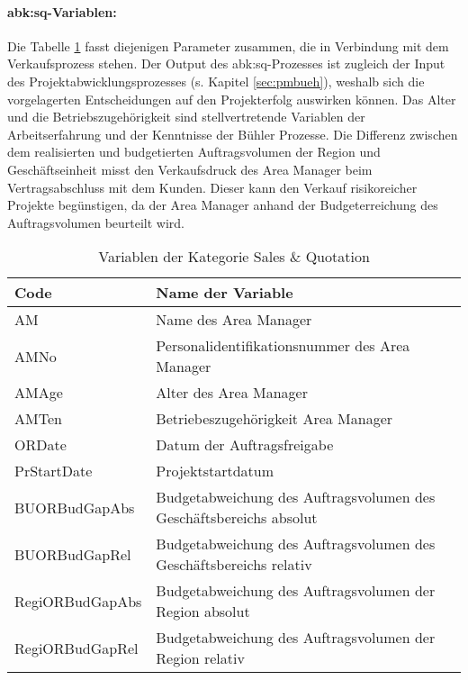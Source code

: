 \paragraph{\gls{abk:sq}-Variablen:} Die Tabelle \ref{tab:sqvar} fasst diejenigen Parameter zusammen, die in Verbindung mit dem Verkaufsprozess stehen. Der Output des \gls{abk:sq}-Prozesses ist zugleich der Input des Projektabwicklungsprozesses (s. Kapitel \ref{sec:pmbueh}), weshalb sich die vorgelagerten Entscheidungen auf den Projekterfolg auswirken können. Das Alter und die Betriebszugehörigkeit sind stellvertretende Variablen der Arbeitserfahrung und der Kenntnisse der Bühler Prozesse. Die Differenz zwischen dem realisierten und budgetierten Auftragsvolumen der Region und Geschäftseinheit misst den Verkaufsdruck des Area Manager beim Vertragsabschluss mit dem Kunden. Dieser kann den Verkauf risikoreicher Projekte begünstigen, da der Area Manager anhand der Budgeterreichung des Auftragsvolumen beurteilt wird.
\begin{table}[H]
	\centering
	\caption{Variablen der Kategorie Sales \& Quotation}
	\begin{tabular}{ll}
		\toprule
		\textbf{Code} & \textbf{Name der Variable} \\
		\midrule
		AM    & Name des Area Manager \\
		AMNo  & Personalidentifikationsnummer des Area Manager  \\
		AMAge & Alter des Area Manager  \\
		AMTen & Betriebeszugehörigkeit Area Manager  \\
		ORDate & Datum der Auftragsfreigabe \\
		PrStartDate & Projektstartdatum \\
		BUORBudGapAbs & Budgetabweichung des Auftragsvolumen des Geschäftsbereichs absolut \\
		BUORBudGapRel & Budgetabweichung des Auftragsvolumen des Geschäftsbereichs relativ \\
		RegiORBudGapAbs & Budgetabweichung des Auftragsvolumen der Region absolut \\
		RegiORBudGapRel & Budgetabweichung des Auftragsvolumen der Region relativ \\
		\bottomrule
	\end{tabular}%
	\label{tab:sqvar}%
\end{table}%

